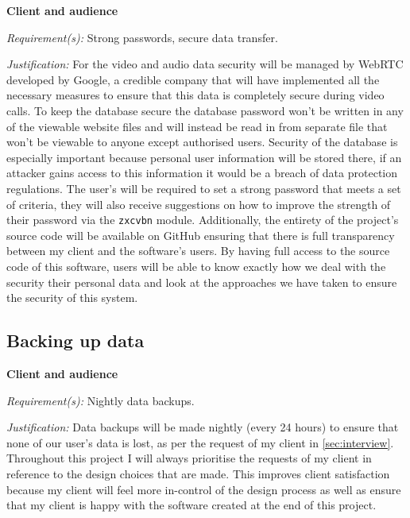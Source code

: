 \textsf{\bfseries Client and audience} \\ \vspace{0.1cm}

\textit{Requirement(s):} Strong passwords, secure data
transfer. \\ \vspace{0.1cm}

\textit{Justification:}
For the video and audio data security will be managed by
WebRTC developed by Google, a credible company that will have
implemented all the necessary measures to ensure that this
data is completely secure during video calls. To keep the
database secure the database password won't be written in any
of the viewable website files and will instead be read in from
separate file that won't be viewable to anyone except
authorised users. Security of the database is especially
important because personal user information will be stored
there, if an attacker gains access to this information it
would be a breach of data protection regulations.
The user's will be required to set a strong password that
meets a set of criteria, they will also receive suggestions
on how to improve the strength of their password via the
\texttt{zxcvbn} module. Additionally, the entirety of the
project's source code will be available on GitHub
ensuring that there is full transparency between my client
and the software's users. By having full access to the source
code of this software, users will be able to know exactly how
we deal with the security their personal data and look at the
approaches we have taken to ensure the security of this
system.

\subsection{Backing up data}

\textsf{\bfseries Client and audience} \\ \vspace{0.1cm}

\textit{Requirement(s):} Nightly data backups. \\ \vspace{0.1cm}

\textit{Justification:}
Data backups will be made nightly (every 24 hours) to ensure
that none of our user's data is lost, as per the request of
my client in \ref{sec:interview}. Throughout this project I
will always prioritise the requests of my client in reference
to the design choices that are made. This improves client
satisfaction because my client will feel more in-control of
the design process as well as ensure that my client is happy
with the software created at the end of this project.

